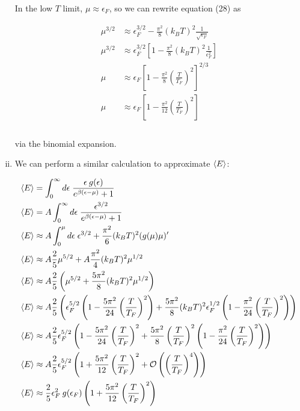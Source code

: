 \documentclass[]{article}
\begin{document}
\begin{enumerate}[i.]
In the low $T$ limit, $\mu \approx \epsilon_F$, so we can rewrite equation (28) as

\begin{equation}\label{eq:29}
\begin{aligned}
\mu^{3/2} & \approx  \epsilon_F^{3/2} -  \frac{\pi^2}{8} (k_B T)^2 \frac{1}{\sqrt{\epsilon_F}} \\
\mu^{3/2} & \approx  \epsilon_F^{3/2} \left[ 1 -  \frac{\pi^2}{8} (k_B T)^2 \frac{1}{\epsilon_F^2 } \right]  \\
\mu & \approx  \epsilon_F \left[ 1 -  \frac{\pi^2}{8}  \left( \frac{  T  }{T_F } \right)^2 \right]^{2/3}  \\
\mu & \approx  \epsilon_F \left[ 1 -  \frac{\pi^2}{12}  \left( \frac{  T  }{T_F } \right)^2 \right]  \\
\end{aligned}
\end{equation}\\

via the binomial expansion. \\

\item We can perform a similar calculation to approximate $\expval{E}$:


\begin{equation}\label{eq:30}
\begin{aligned}
\expval{E} & = \int_0^\infty d\epsilon \; \frac{ \epsilon \: g(\epsilon) }{ e^{\beta(\epsilon - \mu)} +1} \\
\expval{E} & = A \int_0^\infty d\epsilon \; \frac{  \epsilon^{3/2} }{ e^{\beta(\epsilon - \mu)} +1} \\
\expval{E} & \approx A  \int_0^\mu d\epsilon \; \epsilon^{3/2} + \frac{\pi^2}{6} (k_B T)^2 (g(\mu)\mu)' \\
\expval{E} & \approx A \frac{2}{5} \mu^{5/2} + A \frac{\pi^2}{4} (k_B T)^2 \mu^{1/2}  \\
\expval{E} & \approx A \frac{2}{5} \left( \mu^{5/2}   + \frac{5 \pi^2}{8} (k_B T)^2 \mu^{1/2} \right) \\
\expval{E} & \approx A \frac{2}{5} \left( \epsilon_F^{5/2} \left( 1 -  \frac{5\pi^2}{24}  \left( \frac{  T  }{T_F } \right)^2  \right)   + \frac{5 \pi^2}{8} (k_B T)^2 \epsilon_F^{1/2}  \left( 1 -  \frac{\pi^2}{24}  \left( \frac{  T  }{T_F } \right)^2   \right) \right) \\
\expval{E} & \approx A \frac{2}{5} \epsilon_F^{5/2}  \left( 1 -  \frac{5\pi^2}{24}  \left( \frac{  T  }{T_F } \right)^2    + \frac{5 \pi^2}{8} \left( \frac{T}{T_F} \right)^2  \left( 1 -  \frac{\pi^2}{24}  \left( \frac{  T  }{T_F } \right)^2   \right) \right) \\
\expval{E} & \approx A \frac{2}{5} \epsilon_F^{5/2}  \left( 1 + \frac{5\pi^2}{12}  \left( \frac{  T  }{T_F } \right)^2 + \mathcal{O}\left( \left( \frac{T}{T_F} \right)^4 \right)\right) \\
\expval{E} & \approx  \frac{2}{5} \epsilon_F^2 \:  g(\epsilon_F)   \left( 1 +  \frac{5\pi^2}{12}  \left( \frac{  T  }{T_F } \right)^2 \right) \\
\end{aligned}
\end{equation}\\



\end{enumerate}
\end{document}
